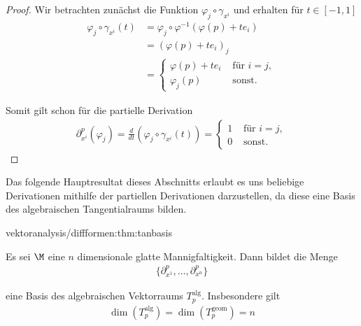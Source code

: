\documentclass[letterpaper,10pt,english]{jupyterBook}
\begin{document}
\begin{proof}
 Wir betrachten zunächst die Funktion \(\varphi_j \circ \gamma_{x^i}\) und erhalten für \(t\in [-1,1]\)
\begin{align*}
\varphi_j \circ \gamma_{x^i}(t)
&= \varphi_j \circ \varphi^{-1}(\varphi(p) + t e_i)\\
&= (\varphi(p) + t e_i)_j\\ 
&=
\begin{cases}
\varphi(p) + t e_i &\text{ für } i=j,\\
\varphi_j(p)&\text{ sonst}.
\end{cases}
\end{align*}
\par
Somit gilt schon für die partielle Derivation
\begin{align*}
\partial_{x^i}^p(\varphi_j)=
\frac{d}{dt} (\varphi_j \circ \gamma_{x^i}(t)) = 
\begin{cases}
1&\text{ für } i=j,\\
0&\text{ sonst}.
\end{cases}
\end{align*}\end{proof}

\par
Das folgende Hauptresultat dieses Abschnitts erlaubt es uns beliebige Derivationen mithilfe der partiellen Derivationen darzustellen, da diese eine Basis des algebraischen Tangentialraums bilden.
\begin{theorem}{}{vektoranalysis/diffformen:thm:tanbasis}



\par
Es sei \(\M\) eine \(n\) dimensionale glatte Mannigfaltigkeit.
Dann bildet die Menge
\begin{align*}
\{\partial_{x^1}^p,\ldots,\partial_{x^n}^p\}
\end{align*}
\par
eine Basis des algebraischen Vektorraums \(T^{\text{alg}}_p\).
Insbesondere gilt
\begin{align*}
\dim(T^{\text{alg}}_p)=\dim(T^{\text{geom}}_p)=n
\end{align*}\end{theorem}
\end{document}
